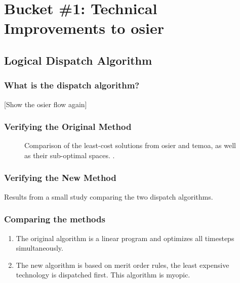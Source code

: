 \section{Bucket \#1: Technical Improvements to \gls{osier}}

\subsection{Logical Dispatch Algorithm}
\begin{frame}
    \frametitle{What is the dispatch algorithm?}

    [Show the osier flow again]

\end{frame}


\begin{frame}
    \frametitle{Verifying the Original Method}

    \begin{figure}
        \centering
        \resizebox{0.75\columnwidth}{!}{}
        \caption{Comparison of the least-cost solutions from \gls{osier} and \gls{temoa}, as well as their sub-optimal spaces.
        .}
        \label{fig:osier-temoa-benchmark}
    \end{figure}
\end{frame}

\begin{frame}
    \frametitle{Verifying the New Method}

    \begin{table}
        \centering
        \caption{Results from a small study comparing the two dispatch algorithms.
        }
        \label{tab:alg-comparison}
        \resizebox{\columnwidth}{!}{}
    \end{table}

\end{frame}

\begin{frame}
    \frametitle{Comparing the methods}

    \begin{enumerate}
        \item The original algorithm is a linear program and optimizes all
        timesteps simultaneously.
        \item The new algorithm is based on merit order rules, the least
        expensive technology is dispatched first. This algorithm is myopic.
    \end{enumerate}
    
\end{frame}

